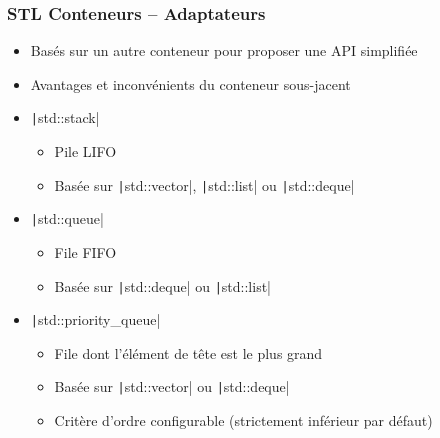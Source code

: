 \documentclass[C++.tex]{subfiles}
\begin{document}
\begin{frame}[fragile]
	\frametitle{STL Conteneurs -- Adaptateurs}
	\begin{itemize}
		\item Basés sur un autre conteneur pour proposer une API simplifiée
		\item Avantages et inconvénients du conteneur sous-jacent
		\item \texttt|std::stack|
		\begin{itemize}
			\item Pile LIFO
			\item Basée sur \texttt|std::vector|, \texttt|std::list| ou \texttt|std::deque|
		\end{itemize} 
		\item \texttt|std::queue|
		\begin{itemize}
			\item File FIFO
			\item Basée sur \texttt|std::deque| ou \texttt|std::list|
		\end{itemize} 
		\item \texttt|std::priority_queue|
		\begin{itemize}
			\item File dont l'élément de tête est le plus grand
			\item Basée sur \texttt|std::vector| ou \texttt|std::deque|
			\item Critère d'ordre configurable (strictement inférieur par défaut)
		\end{itemize} 
	\end{itemize}
\end{frame}
\end{document}
